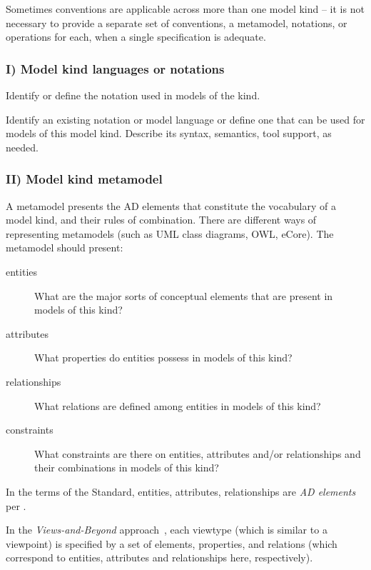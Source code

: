 Sometimes conventions are applicable across more than one model kind
-- it is not necessary to provide a separate set of conventions, a
metamodel, notations, or operations for each, when a single
specification is adequate.


\subsubsection*{I) Model kind languages or notations \Optional}

Identify or define the notation used in models of the kind.

Identify an existing notation or model language or define one that can
be used for models of this model kind. Describe its syntax, semantics,
tool support, as needed.


\subsubsection*{II) Model kind metamodel \Optional} 

A metamodel presents the AD elements that constitute the
vocabulary of a model kind, and their rules of combination. There are
different ways of representing metamodels (such as UML class diagrams, OWL,
eCore). The metamodel should present:
\begin{description}
\item[entities] What are the major sorts of conceptual elements that
  are present in models of this kind?
\item[attributes] What properties do entities possess in models of
  this kind?
\item[relationships] What relations are defined among entities in
  models of this kind?
\item[constraints] What constraints are there on entities, attributes
  and/or relationships and their combinations in models of this kind?
\end{description}


In the terms of the Standard, entities, attributes, relationships are
\textit{AD elements} per .

In the \textit{Views-and-Beyond} approach~\cite{DSA:2010},  each
viewtype (which is similar to a viewpoint) is specified by a set of
elements, properties, and relations (which correspond to entities,
attributes and relationships here, respectively).

